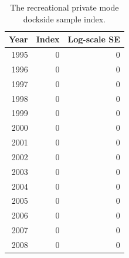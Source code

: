 \documentclass[12pt,]{article}
\begin{document}
\begin{table}[ht]
\centering
\caption{The recreational private mode 
                                            dockside sample index.} 
\label{tab:Fleet9_GillnetSurvey_index}
\begin{tabular}{rrr}
  \hline
Year & Index & Log-scale SE \\ 
  \hline
1995 & 0 & 0 \\ 
  1996 & 0 & 0 \\ 
  1997 & 0 & 0 \\ 
  1998 & 0 & 0 \\ 
  1999 & 0 & 0 \\ 
  2000 & 0 & 0 \\ 
  2001 & 0 & 0 \\ 
  2002 & 0 & 0 \\ 
  2003 & 0 & 0 \\ 
  2004 & 0 & 0 \\ 
  2005 & 0 & 0 \\ 
  2006 & 0 & 0 \\ 
  2007 & 0 & 0 \\ 
  2008 & 0 & 0 \\ 
   \hline
\end{tabular}
\end{table}

\FloatBarrier

\vspace{2in}
\end{document}
